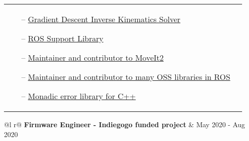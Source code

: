 \documentclass[a4paper,12pt]{article}
\begin{document}
\begin{tabularx}{\linewidth}{ @{}l r@{} }
{\begin{minipage}[t]{\linewidth}
\begin{itemize}[nosep,after=\strut, leftmargin=1em, itemsep=3pt]
        \item[--] \href{https://github.com/pickNikRobotics/pick_ik}{Gradient Descent Inverse Kinematics Solver}
        \item[--] \href{https://github.com/picknikrobotics/RSL}{ROS Support Library}
        \item[--] \href{https://github.com/ros-planning/moveit2}{Maintainer and contributor to MoveIt2}
        \item[--] \href{http://ros.rocks/?q=Tyler+Weaver}{Maintainer and contributor to many OSS libraries in ROS}
        \item[--] \href{https://www.fplib.dev/}{Monadic error library for C++}
    \end{itemize}
    \end{minipage}}  \\
\end{tabularx}

\begin{tabularx}{\linewidth}{ @{}l r@{} }
\textbf{Firmware Engineer - Indiegogo funded project} & \hfill May 2020 - Aug 2020 \\[3.75pt]
\end{tabularx}
\end{document}

